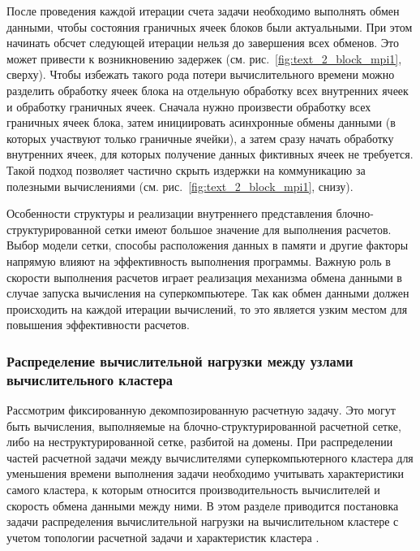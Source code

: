 После проведения каждой итерации счета задачи необходимо выполнять обмен данными, чтобы состояния граничных ячеек блоков были актуальными.
При этом начинать обсчет следующей итерации нельзя до завершения всех обменов.
Это может привести к возникновению задержек (см. рис.~\ref{fig:text_2_block_mpi1}, сверху).
Чтобы избежать такого рода потери вычислительного времени можно разделить обработку ячеек блока на отдельную обработку всех внутренних ячеек и обработку граничных ячеек.
Сначала нужно произвести обработку всех граничных ячеек блока, затем инициировать асинхронные обмены данными (в которых участвуют только граничные ячейки), а затем сразу начать обработку внутренних ячеек, для которых получение данных фиктивных ячеек не требуется.
Такой подход позволяет частично скрыть издержки на коммуникацию за полезными вычислениями (см. рис.~\ref{fig:text_2_block_mpi1}, снизу).

Особенности структуры и реализации внутреннего представления блочно-структурированной сетки имеют большое значение для выполнения расчетов.
Выбор модели сетки, способы расположения данных в памяти и другие факторы напрямую влияют на эффективность выполнения программы.
Важную роль в скорости выполнения расчетов играет реализация механизма обмена данными в случае запуска вычисления на суперкомпьютере.
Так как обмен данными должен происходить на каждой итерации вычислений, то это является узким местом для повышения эффективности расчетов.

\subsubsection{Распределение вычислительной нагрузки между узлами \mbox{вычислительного} кластера}\label{sec:text_2_getero}

Рассмотрим фиксированную декомпозированную расчетную задачу.
Это могут быть вычисления, выполняемые на блочно-структурированной расчетной сетке, либо на неструктурированной сетке, разбитой на домены.
При распределении частей расчетной задачи между вычислителями суперкомпьютерного кластера для уменьшения времени выполнения задачи необходимо учитывать характеристики самого кластера, к которым относится производительность вычислителей и скорость обмена данными между ними.
В этом разделе приводится постановка задачи распределения вычислительной нагрузки на вычислительном кластере с учетом топологии расчетной задачи и характеристик кластера \cite{Rybakov2018Distr,Rybakov2017Part}.

